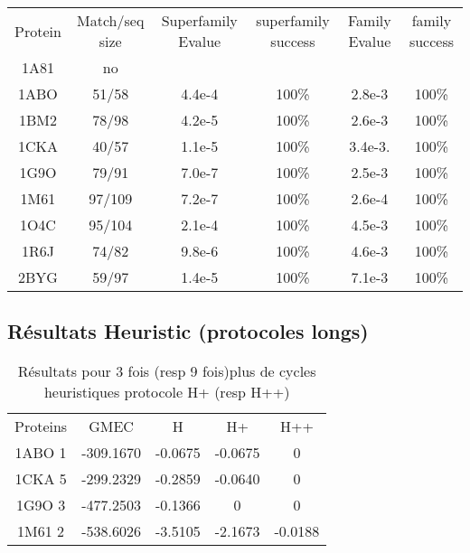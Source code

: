     \begin{table}[h]
           \raggedleft{}

      \begin{tabular}{cccccc}

        \toprule
        Protein & Match/seq size & Superfamily Evalue & superfamily success & Family Evalue & family success\\
        \cmidrule{1-6}
        1A81 & no & & & & \\
        1ABO & 51/58 & 4.4e-4 & 100\% & 2.8e-3 & 100\% \\
        1BM2 & 78/98 & 4.2e-5 & 100\% & 2.6e-3 & 100\% \\
        1CKA & 40/57 & 1.1e-5 & 100\% & 3.4e-3. & 100\% \\
        1G9O & 79/91 & 7.0e-7 & 100\% & 2.5e-3 & 100\%  \\
        1M61 & 97/109 & 7.2e-7 & 100\% & 2.6e-4 &  100\% \\
        1O4C & 95/104 & 2.1e-4 & 100\% & 4.5e-3 &  100\% \\
        1R6J & 74/82 & 9.8e-6 & 100\% & 4.6e-3 &  100\% \\
        2BYG & 59/97 & 1.4e-5 & 100\% & 7.1e-3 &  100\% \\
        \bottomrule        
      \end{tabular}      

\label{tab:superfamily_bestRE}       
\end{table}

    \clearpage



   \subsection{Résultats Heuristic (protocoles longs)}


    \begin{table}[h]
      \centering

      \begin{tabular}{ccccc}

        \toprule
        Proteins & GMEC & H & H+ & H++ \\
        \cmidrule{1-5}
        1ABO 1 & -309.1670 & -0.0675 & -0.0675 & 0 \\
        1CKA 5 & -299.2329 & -0.2859 & -0.0640 & 0 \\
        1G9O 3 & -477.2503 & -0.1366 & 0 & 0 \\
        1M61 2 & -538.6026 & -3.5105 & -2.1673 & -0.0188 \\
        \toprule


 \end{tabular}      
 \caption{Résultats pour 3 fois (resp 9 fois)plus de cycles heuristiques protocole H+ (resp H++)}
\label{tab:H+_H++}       
\end{table}


